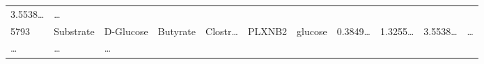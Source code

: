 \documentclass[
]{article}
\begin{document}
\begin{longtable}[]{@{}lllllllllll@{}}
\begin{minipage}[t]{0.07\columnwidth}
3.5538\ldots{}\strut
\end{minipage} & \begin{minipage}[t]{0.03\columnwidth}\raggedright
\ldots{}\strut
\end{minipage}\tabularnewline
\begin{minipage}[t]{0.03\columnwidth}\raggedright
5793\strut
\end{minipage} & \begin{minipage}[t]{0.07\columnwidth}\raggedright
Substrate\strut
\end{minipage} & \begin{minipage}[t]{0.07\columnwidth}\raggedright
D-Glucose\strut
\end{minipage} & \begin{minipage}[t]{0.09\columnwidth}\raggedright
Butyrate\strut
\end{minipage} & \begin{minipage}[t]{0.07\columnwidth}\raggedright
Clostr\ldots{}\strut
\end{minipage} & \begin{minipage}[t]{0.07\columnwidth}\raggedright
PLXNB2\strut
\end{minipage} & \begin{minipage}[t]{0.09\columnwidth}\raggedright
glucose\strut
\end{minipage} & \begin{minipage}[t]{0.07\columnwidth}\raggedright
0.3849\ldots{}\strut
\end{minipage} & \begin{minipage}[t]{0.07\columnwidth}\raggedright
1.3255\ldots{}\strut
\end{minipage} & \begin{minipage}[t]{0.07\columnwidth}\raggedright
3.5538\ldots{}\strut
\end{minipage} & \begin{minipage}[t]{0.03\columnwidth}\raggedright
\ldots{}\strut
\end{minipage}\tabularnewline
\begin{minipage}[t]{0.03\columnwidth}\raggedright
\ldots{}\strut
\end{minipage} & \begin{minipage}[t]{0.07\columnwidth}\raggedright
\ldots{}\strut
\end{minipage} & \begin{minipage}[t]{0.07\columnwidth}\raggedright
\ldots{}\strut
\end{minipage} & \begin{minipage}[t]{0.09\columnwidth}\raggedright

\end{minipage}
\end{longtable}
\end{document}
